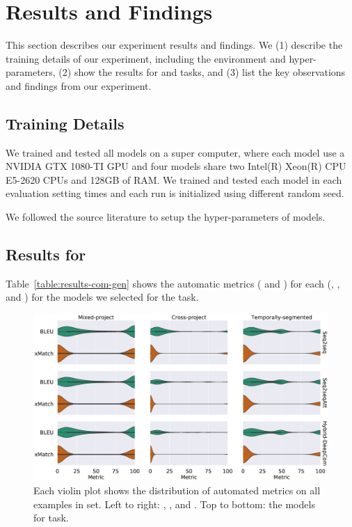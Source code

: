 \section{Results and Findings}
\label{sec:eval}

This section describes our experiment results and findings.  We (1)
describe the training details of our experiment, including the
environment and hyper-parameters, (2) show the results for \comgen and
\methnam tasks, and (3) list the key observations and findings from
our experiment.

\subsection{Training Details}
\label{sec:eval:hyparam}

We trained and tested all models on a super computer, where each model
use a NVIDIA GTX 1080-TI GPU and four models share two Intel(R)
Xeon(R) CPU E5-2620 CPUs and 128GB of RAM.  We trained and tested each
model in each evaluation setting \NumTrial times and each run is
initialized using different random seed.

We followed the source literature to setup the hyper-parameters of
models. 

\subsection{Results for \ComGen}
\label{sec:eval:results-comgen}



Table~\ref{table:results-com-gen} shows the automatic metrics (\bleu
and \xmatch) for each \methodology (\mixedproj, \crossproj, and
\evoaware) for the models we selected for the \comgen task.

\begin{figure}[t]
  \centering
  \includegraphics[width=\columnwidth]{figs/models-results-metrics-dist-ComGen.eps}
  \caption{Each violin plot shows the distribution of automated
    metrics on all examples in \test set.  Left to right: \mixedproj,
    \crossproj, and \evoaware \methodologies.  Top to bottom: the
    models for \comgen
    task. \label{fig:models-results-metrics-dist-ComGen}}
\end{figure}

